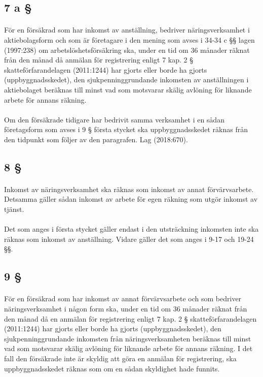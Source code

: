 \documentclass[a4paper,notitlepage,openany,10pt]{book}
\begin{document}
\subsection*{7 a §}
\paragraph*{}
För en försäkrad som har inkomst av anställning, bedriver näringsverksamhet i aktiebolagsform och som är företagare i den mening som avses i 34-34 c §§ lagen (1997:238) om arbetslöshetsförsäkring ska, under en tid om 36 månader räknat från den månad då anmälan för registrering enligt 7 kap. 2 § skatteförfarandelagen (2011:1244) har gjorts eller borde ha gjorts (uppbyggnadsskedet), den sjukpenninggrundande inkomsten av anställningen i aktiebolaget beräknas till minst vad som motsvarar skälig avlöning för liknande arbete för annans räkning.
\paragraph*{}
Om den försäkrade tidigare har bedrivit samma verksamhet i en sådan företagsform som avses i 9 § första stycket ska uppbyggnadsskedet räknas från den tidpunkt som följer av den paragrafen.
Lag (2018:670).
\subsection*{8 §}
\paragraph*{}
Inkomst av näringsverksamhet ska räknas som inkomst av annat förvärvsarbete. Detsamma gäller sådan inkomst av arbete för egen räkning som utgör inkomst av tjänst.
\paragraph*{}
Det som anges i första stycket gäller endast i den utsträckning inkomsten inte ska räknas som inkomst av anställning. Vidare gäller det som anges i 9-17 och 19-24 §§.
\subsection*{9 §}
\paragraph*{}
För en försäkrad som har inkomst av annat förvärvsarbete och som bedriver näringsverksamhet i någon form ska, under en tid om 36 månader räknat från den månad då en anmälan för registrering enligt 7 kap. 2 § skatteförfarandelagen (2011:1244) har gjorts eller borde ha gjorts (uppbyggnadsskedet), den sjukpenninggrundande inkomsten från näringsverksamheten beräknas till minst vad som motsvarar skälig avlöning för liknande arbete för annans räkning. I det fall den försäkrade inte är skyldig att göra en anmälan för registrering, ska uppbyggnadsskedet räknas som om en sådan skyldighet hade funnits.
\end{document}
